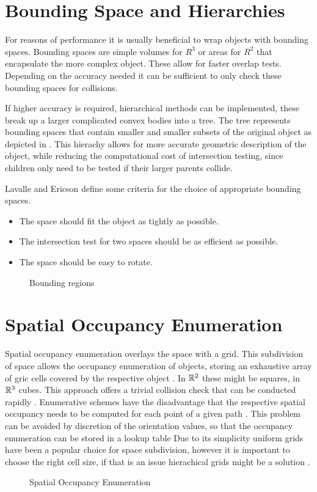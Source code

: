 \section{Bounding Space and Hierarchies}
For reasons of performance it is usually beneficial to wrap objects with bounding spaces. Bounding spaces are simple volumes for $R^3$ or areas for $R^2$ that encapsulate the more complex object. These allow for faster overlap tests. Depending on the accuracy needed it can be sufficient to only check these bounding spaces for collisions. \cite{LaValle.2006} \cite{Ericson.2005}

If higher accuracy is required, hierarchical methods can be implemented, these break up a larger complicated convex bodies into a tree. The tree represents bounding spaces that contain smaller and smaller subsets of the original object as depicted in . This hierachy allows for more accurate geometric description of the object, while reducing the computational cost of intersection testing, since children only need to be tested if their larger parents collide. \cite{LaValle.2006} \cite{Ericson.2005}

Lavalle and Ericson define some criteria for the choice of appropriate bounding spaces.

\begin{itemize}
	\item The space should fit the object as tightly as possible.
	\item The intersection test for two spaces should be as efficient as possible.
	\item The space should be easy to rotate.
\end{itemize}

\begin{figure}[h]
    \caption{Bounding regions}
    \label{fig:boundingRegions}
\end{figure}

\section{Spatial Occupancy Enumeration}
Spatial occupancy enumeration overlays the space with a grid. This subdivision of space allows the occupancy enumeration of objects, storing an exhaustive array of gric cells covered by the respective object \cite{Ericson.2005} \cite{Hayward.1986}. In $\mathbb{R}^2$ these might be squares, in $\mathbb{R}^3$ cubes. This approach offers a trivial collision check that can be conducted rapidly \cite{Ericson.2005} \cite{Hayward.1986}. Enumerative schemes have the disadvantage that the respective spatial occupancy needs to be computed for each point of a given path \cite{Hayward.1986}. This problem can be avoided by discretion of the orientation values, so that the occupancy enumeration can be stored in a lookup table \cite{Ziegler.2008} Due to its simplicity uniform grids have been a popular choice for space subdivision, however it is important to choose the right cell size, if that is an issue hierachical grids might be a solution \cite{Ericson.2005}.

\begin{figure}[h]
    \caption{Spatial Occupancy Enumeration}
    \label{fig:spatialOccupancyEnumeration}
\end{figure}